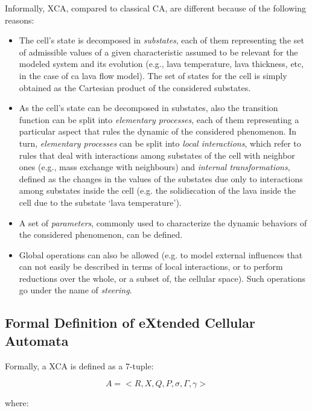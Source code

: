 Informally, XCA, compared to classical CA, are different because of
the following reasons:

\begin{itemize}

\item The cell's state is decomposed in \emph{substates}, each of them
  representing the set of admissible values of a given characteristic
  assumed to be relevant for the modeled system and its evolution (e.g., lava temperature, lava thickness, etc, in the case of ca lava flow model). The
  set of states for the cell is simply obtained as the Cartesian
  product of the considered substates.

\item As the cell's state can be decomposed in substates, also the
  transition function can be split into \emph{elementary processes},
  each of them representing a particular aspect that rules the dynamic
  of the considered phenomenon. In turn, \emph{elementary processes} can be split into \emph{local interactions}, which refer to rules that deal with interactions among substates of the cell with neighbor ones (e.g., mass exchange with neighbours) and \emph{internal transformations}, defined as the
changes in the values of the substates due only
to interactions among substates inside the cell
(e.g. the solidi¢cation of the lava inside the cell
due to the substate ‘lava temperature’).

\item A set of \emph{parameters}, commonly used to characterize the dynamic behaviors of the considered phenomenon, can be defined.

\item Global operations can also be allowed (e.g. to model external
  influences that can not easily be described in terms of local
  interactions, or to perform reductions over the whole, or a subset of,
  the cellular space). Such operations go under the name of
  \emph{steering}.
  
\end{itemize}


\subsection{Formal Definition of eXtended Cellular Automata}


Formally, a XCA is defined as a 7-tuple:

$$ A = <R,X,Q,P,\sigma,\Gamma,\gamma>$$

\noindent where:

